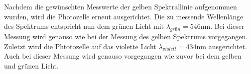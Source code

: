 Nachdem die gewünschten Messwerte der gelben Spektrallinie aufgenommen wurden, wird die Photozelle erneut ausgerichtet.
Die zu messende Wellenlänge des Spektrums entspricht nun dem grünen Licht mit $\lambda_{grün} = 546 \si{\nano\meter}$.
Bei dieser Messung wird genauso wie bei der Messung des gelben Spektrums vorgegangen.
Zuletzt wird die Phtotozelle auf das violette Licht $\lambda_{violett} = 434 \si{\nano\meter}$ ausgerichtet.
Auch bei dieser Messung wird genauso vorgegangen wie zuvor bei dem gelben und grünen Licht.
